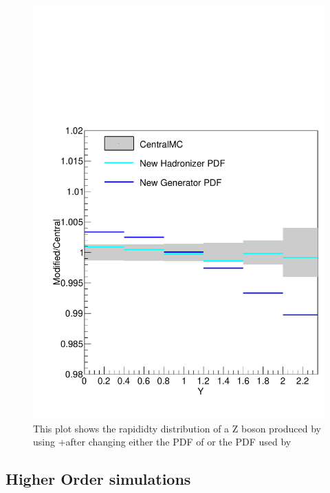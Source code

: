 \begin{figure}
    \centering
    \includegraphics[width=\textwidth]{figures/Simulation/RAtioComparisons.pdf}
    \caption{This plot shows the rapididty distribution of a Z boson produced by using \POWHEG+\PYTHIAeight after changing either the PDF of \POWHEG or the PDF used by \PYTHIAeight}
    \label{fig:PDFToTunesCompare}
\end{figure}




\subsection{Higher Order simulations}\label{sec:HighOrder}

